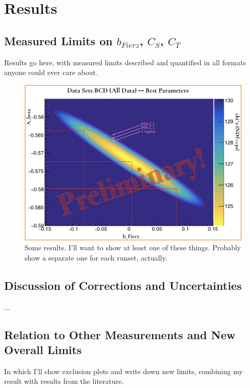 


\clearpage	
\chapter{Results}
\label{results_chapter}

\section{Measured Limits on $b_{Fierz}$, $C_S$, $C_T$}
	Results go here, with measured limits described and quantified in all formats anyone could ever care about.
	
\begin{figure}[h!!!t]
	\centering
	\includegraphics[width=.999\linewidth]
	{Figures/Abeta_bFierz_2D_prelim.png}
	\caption{Some results.  I'll want to show at least one of these things.  Probably show a separate one for each runset, actually.}	
	\label{fig:2d_results_bcd}
\end{figure}

\section{Discussion of Corrections and Uncertainties}
	...
	
\section{Relation to Other Measurements and New Overall Limits}
	In which I'll show exclusion plots and write down new limits, combining my result with results from the literature.


